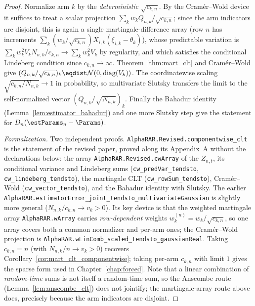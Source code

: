 \begin{proof}\leanok
{}
Normalize arm $k$ by the \emph{deterministic} $\sqrt{c_{k,n}}$. By the Cramér--Wold device it
suffices to treat a scalar projection $\sum_k w_k Q_{n,k}/\sqrt{c_{k,n}}$; since the arm indicators
are disjoint, this is again a single martingale-difference array (row $n$ has increments
$\sum_k (w_k/\sqrt{c_{k,n}})X_{i,k}(\xi_{i,k}-\theta_k)$), whose predictable variation is
$\sum_k w_k^2 V_k N_{n,k}/c_{k,n}\to\sum_k w_k^2V_k$ by regularity, and which satisfies the
conditional Lindeberg condition since $c_{k,n}\to\infty$. Theorem~\ref{thm:mart_clt} and
Cramér--Wold give $(Q_{n,k}/\sqrt{c_{k,n}})_k\eqdist\mathcal N(0,\mathrm{diag}(V_k))$. The
coordinatewise scaling $\sqrt{c_{k,n}/N_{n,k}}\to1$ in probability, so multivariate Slutsky
transfers the limit to the self-normalized vector $(Q_{n,k}/\sqrt{N_{n,k}})_k$. Finally the Bahadur
identity (Lemma~\ref{lem:estimator_bahadur}) and one more Slutsky step give the statement for
$D_n(\estParams_n-\Params)$.

\emph{Formalization.} Two independent proofs. \texttt{AlphaRAR.Revised.componentwise\_clt} is the
statement of the revised paper, proved along its Appendix~A without the declarations below: the
array \texttt{AlphaRAR.Revised.cwArray} of the $Z_{n,t}$, its conditional variance and Lindeberg
sums (\texttt{cw\_predVar\_tendsto}, \texttt{cw\_lindeberg\_tendsto}), the martingale CLT
(\texttt{cw\_rowSum\_tendsto}), Cramér--Wold (\texttt{cw\_vector\_tendsto}), and the Bahadur
identity with Slutsky. The earlier \texttt{AlphaRAR.estimatorError\_joint\_tendsto\_multivariateGaussian}
is slightly more general ($N_{n,k}/c_{k,n}\to v_k>0$). Its key
device is that the weighted martingale array \texttt{AlphaRAR.wArray} carries \emph{row-dependent}
weights $w^{(n)}_k = w_k/\sqrt{c_{k,n}}$, so one array covers both a common normalizer and per-arm
ones; the Cramér--Wold projection is
\texttt{AlphaRAR.wLinComb\_scaled\_tendsto\_gaussianReal}. Taking $c_{k,n}=n$ (with
$N_{n,k}/n\to v_k>0$) recovers Corollary~\ref{cor:mart_clt_componentwise}; taking per-arm $c_{k,n}$
with limit $1$ gives the sparse form used in Chapter~\ref{chap:forced}. Note that a linear
combination of \emph{random-time} sums is not itself a random-time sum, so the Anscombe route
(Lemma~\ref{lem:anscombe_clt}) does not jointify; the martingale-array route above does, precisely
because the arm indicators are disjoint.
\end{proof}

